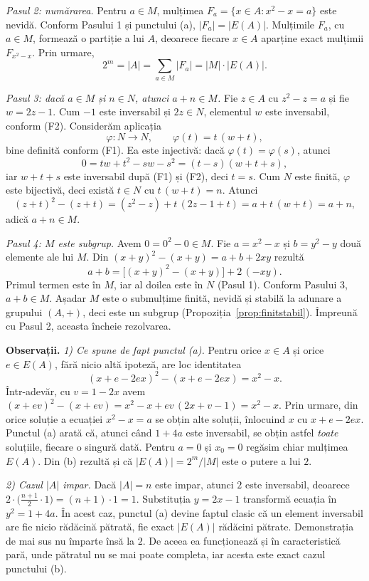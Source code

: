 \begin{solutie}
\textit{Pasul 2: numărarea.} Pentru $a\in M$, mulțimea
$F_{a}=\{x\in A : x^{2}-x=a\}$ este nevidă. Conform Pasului 1 și punctului (a),
$|F_{a}|=|E(A)|$. Mulțimile $F_{a}$, cu $a\in M$, formează o partiție a lui
$A$, deoarece fiecare $x\in A$ aparține exact mulțimii $F_{x^{2}-x}$. Prin
urmare,
\[
  2^{m}=|A|=\sum_{a\in M}|F_{a}|=|M|\cdot|E(A)|.
\]

\textit{Pasul 3: dacă $a\in M$ și $n\in N$, atunci $a+n\in M$.} Fie $z\in A$ cu
$z^{2}-z=a$ și fie $w=2z-1$. Cum $-1$ este inversabil și $2z\in N$, elementul
$w$ este inversabil, conform (F2). Considerăm aplicația
\[
  \varphi:N\to N,\qquad \varphi(t)=t\,(w+t),
\]
bine definită conform (F1). Ea este injectivă: dacă $\varphi(t)=\varphi(s)$,
atunci
\[
  0=tw+t^{2}-sw-s^{2}=(t-s)(w+t+s),
\]
iar $w+t+s$ este inversabil după (F1) și (F2), deci $t=s$. Cum $N$ este finită,
$\varphi$ este bijectivă, deci există $t\in N$ cu $t\,(w+t)=n$. Atunci
\[
  (z+t)^{2}-(z+t)=(z^{2}-z)+t\,(2z-1+t)=a+t\,(w+t)=a+n,
\]
adică $a+n\in M$.

\textit{Pasul 4: $M$ este subgrup.} Avem $0=0^{2}-0\in M$. Fie
$a=x^{2}-x$ și $b=y^{2}-y$ două elemente ale lui $M$. Din
$(x+y)^{2}-(x+y)=a+b+2xy$ rezultă
\[
  a+b=\bigl[(x+y)^{2}-(x+y)\bigr]+2\,(-xy).
\]
Primul termen este în $M$, iar al doilea este în $N$ (Pasul 1). Conform
Pasului 3, $a+b\in M$. Așadar $M$ este o submulțime finită, nevidă și stabilă
la adunare a grupului $(A,+)$, deci este un subgrup
(Propoziția~\ref{prop:finitstabil}). Împreună cu Pasul 2, aceasta încheie
rezolvarea.

\medskip
\noindent\textbf{Observații.}
\emph{1) Ce spune de fapt punctul (a).} Pentru orice $x\in A$ și orice
$e\in E(A)$, fără nicio altă ipoteză, are loc identitatea
\[
  (x+e-2ex)^{2}-(x+e-2ex)=x^{2}-x .
\]
Într-adevăr, cu $v=1-2x$ avem
$(x+ev)^{2}-(x+ev)=x^{2}-x+ev\,(2x+v-1)=x^{2}-x$. Prin urmare, din orice
soluție a ecuației $x^{2}-x=a$ se obțin alte soluții, înlocuind $x$ cu
$x+e-2ex$. Punctul (a) arată că, atunci când $1+4a$ este inversabil, se obțin
astfel \emph{toate} soluțiile, fiecare o singură dată. Pentru $a=0$ și $x_{0}=0$
regăsim chiar mulțimea $E(A)$. Din (b) rezultă și că $|E(A)|=2^{m}/|M|$ este o
putere a lui $2$.

\emph{2) Cazul $|A|$ impar.} Dacă $|A|=n$ este impar, atunci $2$ este
inversabil, deoarece $2\cdot\bigl(\tfrac{n+1}{2}\cdot1\bigr)=(n+1)\cdot1=1$.
Substituția $y=2x-1$ transformă ecuația în $y^{2}=1+4a$. În acest caz,
punctul (a) devine faptul clasic că un element inversabil are fie nicio
rădăcină pătrată, fie exact $|E(A)|$ rădăcini pătrate. Demonstrația de mai sus
nu împarte însă la $2$. De aceea ea funcționează și în caracteristică pară,
unde pătratul nu se mai poate completa, iar acesta este exact cazul
punctului (b).


\end{solutie}
